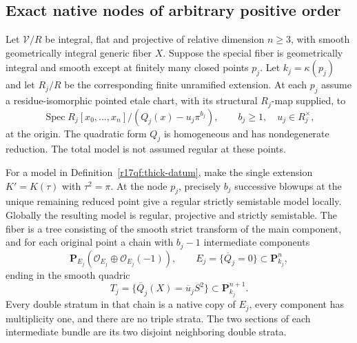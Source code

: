 \subsection{Exact native nodes of arbitrary positive order}

\begin{definition}
\label{r17qf:thick-datum}
Let $\mathcal V/R$ be integral, flat and projective of relative
dimension $n\ge3$, with smooth geometrically integral generic
fiber $X$.  Suppose the special fiber is geometrically
integral and smooth except at finitely many closed points
$p_j$.  Let $k_j=\kappa(p_j)$ and let $R_j/R$ be the
corresponding finite unramified extension.  At each $p_j$
assume a residue-isomorphic pointed etale chart, with its
structural $R_j$-map supplied, to
\[
       \operatorname{Spec}
       R_j[x_0,\ldots,x_n]/(Q_j(x)-u_j\pi^{b_j}),
       \qquad b_j\ge1,\quad u_j\in R_j^\times,
 \tag{QF17.5}\label{r17qf:thick-equation}
\]
at the origin.  The quadratic form $Q_j$ is homogeneous and
has nondegenerate reduction.  The total model is not assumed
regular at these points.
\end{definition}

\begin{proposition}
\label{r17qf:thick-geometry}
For a model in Definition~\ref{r17qf:thick-datum}, make the
single extension $K'=K(\tau)$ with $\tau^2=\pi$.
At the node $p_j$, precisely $b_j$ successive blowups at the
unique remaining reduced point give a regular strictly
semistable model locally.  Globally the resulting model is
regular, projective and strictly semistable.  The fiber is
a tree consisting of the smooth strict transform of the
main component, and for each original point a chain with
$b_j-1$ intermediate components
\[
          \mathbf P_{E_j}
             (\mathcal O_{E_j}\oplus\mathcal O_{E_j}(-1)),
          \qquad
          E_j=\{\overline Q_j=0\}\subset\mathbf P^n_{k_j},
 \tag{QF17.6}\label{r17qf:intermediate}
\]
ending in the smooth quadric
\[
          T_j=\{\overline Q_j(X)=\overline u_j S^2\}
                           \subset\mathbf P^{n+1}_{k_j}.
 \tag{QF17.7}\label{r17qf:terminal}
\]
Every double stratum in that chain is a native copy of $E_j$,
every component has multiplicity one, and there are no triple
strata.  The two sections of each intermediate bundle are its
two disjoint neighboring double strata.
\end{proposition}

